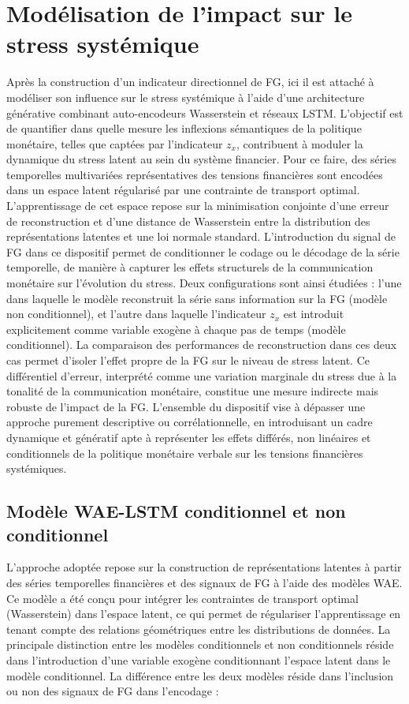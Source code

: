 \section{Modélisation de l’impact sur le stress systémique}

Après la construction d’un indicateur directionnel de FG, ici il est attaché à modéliser son influence sur le stress systémique à l’aide d’une architecture générative combinant auto-encodeurs Wasserstein et réseaux LSTM. L’objectif est de quantifier dans quelle mesure les inflexions sémantiques de la politique monétaire, telles que captées par l’indicateur $z_x$, contribuent à moduler la dynamique du stress latent au sein du système financier. Pour ce faire, des séries temporelles multivariées représentatives des tensions financières sont encodées dans un espace latent régularisé par une contrainte de transport optimal. L’apprentissage de cet espace repose sur la minimisation conjointe d’une erreur de reconstruction et d’une distance de Wasserstein entre la distribution des représentations latentes et une loi normale standard. L’introduction du signal de FG dans ce dispositif permet de conditionner le codage ou le décodage de la série temporelle, de manière à capturer les effets structurels de la communication monétaire sur l’évolution du stress. Deux configurations sont ainsi étudiées : l’une dans laquelle le modèle reconstruit la série sans information sur la FG (modèle non conditionnel), et l’autre dans laquelle l’indicateur $z_x$ est introduit explicitement comme variable exogène à chaque pas de temps (modèle conditionnel). La comparaison des performances de reconstruction dans ces deux cas permet d’isoler l’effet propre de la FG sur le niveau de stress latent. Ce différentiel d’erreur, interprété comme une variation marginale du stress due à la tonalité de la communication monétaire, constitue une mesure indirecte mais robuste de l’impact de la FG. L’ensemble du dispositif vise à dépasser une approche purement descriptive ou corrélationnelle, en introduisant un cadre dynamique et génératif apte à représenter les effets différés, non linéaires et conditionnels de la politique monétaire verbale sur les tensions financières systémiques.

\subsection{Modèle WAE-LSTM conditionnel et non conditionnel}

L’approche adoptée repose sur la construction de représentations latentes à partir des séries temporelles financières et des signaux de FG à l’aide des modèles WAE. Ce modèle a été conçu pour intégrer les contraintes de transport optimal (Wasserstein) dans l’espace latent, ce qui permet de régulariser l’apprentissage en tenant compte des relations géométriques entre les distributions de données. La principale distinction entre les modèles conditionnels et non conditionnels réside dans l’introduction d’une variable exogène conditionnant l'espace latent dans le modèle conditionnel. La différence entre les deux modèles réside dans l'inclusion ou non des signaux de FG dans l’encodage : 

